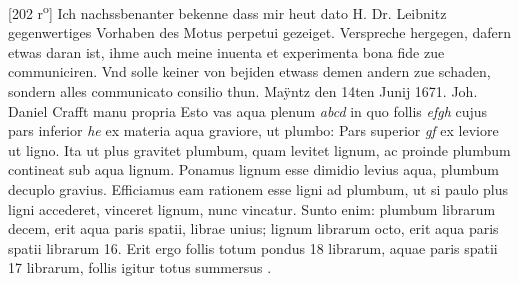         \vspace*{8mm}
        \pstart 
        \normalsize
      [202 r\textsuperscript{o}] Ich nachssbenanter bekenne dass mir heut dato H. Dr. Leibnitz\protect{} gegenwertiges Vorhaben des Motus perpetui\protect{} gezeiget. Verspreche hergegen, dafern etwas daran ist, ihme auch meine inuenta et experimenta bona fide zue communiciren. Vnd solle keiner von bejiden etwass demen andern zue schaden, sondern alles communicato consilio thun. Maÿntz den 14ten Junij 1671.
      \pend
      \pstart Joh. Daniel Crafft manu propria\protect{} 
      \pend \vspace{1.0ex} 
      \pstart Esto vas aqua plenum \textit{abcd}  in quo follis \textit{efgh} cujus pars inferior \textit{he} ex materia aqua graviore, ut plumbo\protect{}: Pars superior \textit{gf} ex leviore ut ligno. Ita ut plus gravitet plumbum\protect{}, quam levitet lignum, ac proinde plumbum\protect{} contineat sub aqua lignum. Ponamus lignum esse dimidio levius aqua, plumbum\protect{} decuplo gravius. Efficiamus eam rationem esse ligni ad plumbum\protect{}, ut si paulo plus ligni accederet, vinceret lignum, nunc vincatur. Sunto enim: plumbum\protect{} librarum decem, erit aqua paris spatii, librae unius; lignum librarum octo, erit aqua paris spatii librarum 16. Erit ergo follis totum pondus 18 librarum, aquae paris spatii 17 librarum, follis igitur totus summersus .
      \pend \clearpage
